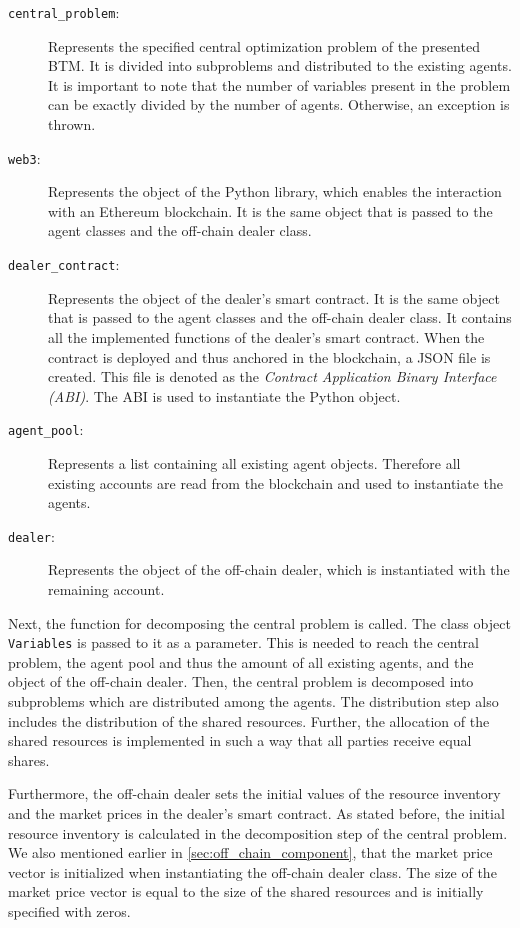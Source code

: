 \begin{description}
	\item[\texttt{central\_problem}:] Represents the specified central optimization problem of the presented BTM.
    It is divided into subproblems and distributed to the existing agents. It is important 
    to note that the number of variables present in the problem can be exactly divided by the number of agents.
    Otherwise, an exception is thrown.
	\item[\texttt{web3}:] Represents the object of the Python library, which enables the interaction with an
	Ethereum blockchain. It is the same object that is passed to the agent classes and the off-chain dealer class.
    \item[\texttt{dealer\_contract}:] Represents the object of the dealer's smart contract. 
    It is the same object that is passed to the agent classes and the off-chain dealer class. It contains all the
    implemented functions of the dealer's smart contract. When the contract is deployed and thus anchored in the blockchain, a JSON file is created. 
    This file is denoted as the \textit{Contract Application Binary Interface (ABI)}. The ABI is used to instantiate the Python object.  
    \item[\texttt{agent\_pool}:] Represents a list containing all existing agent objects. 
    Therefore all existing accounts are read from the blockchain and used to instantiate the agents.
    \item[\texttt{dealer}:] Represents the object of the off-chain dealer, which is instantiated with the 
    remaining account.
\end{description}

Next, the function for decomposing the central problem is called. The class object \verb|Variables| is passed to it as a parameter.
This is needed to reach the central problem, the agent pool and thus the amount of all existing agents, and the object of the
off-chain dealer. 
Then, the central problem is decomposed into subproblems which are distributed among the agents. 
The distribution step also includes the distribution of the shared resources. 
Further, the allocation of the shared resources is implemented in such a way that all parties receive equal shares.

Furthermore, the off-chain dealer sets the initial values of the resource inventory and the market prices in the dealer's
smart contract. As stated before, the initial resource inventory is calculated in the decomposition step of the central problem. 
We also mentioned earlier in \ref{sec:off_chain_component}, that the market price vector is initialized when instantiating the off-chain dealer class.
The size of the market price vector is equal to the size of the shared resources and is initially specified with zeros.

